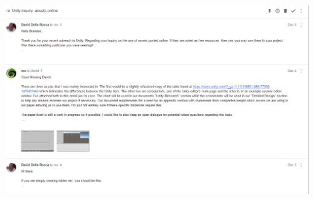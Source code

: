 \documentclass[12pt]{article}
\let\origfigure=\figure
\let\endorigfigure=\endfigure
\renewenvironment{figure}[1][]{%
  \origfigure[H]
}{%
  \endorigfigure
}
\begin{document}
\begin{figure}
\centering
\includegraphics{Pictures/unityCorrespondence.png}
\caption{Correspondence with David Della Rocca of Unity}
\end{figure}



\printbibliography[title=References]
\end{document}
